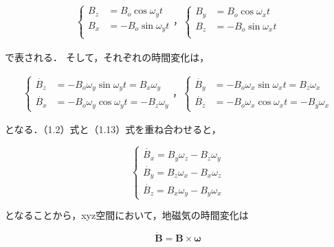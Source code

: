 \begin{align}
    \left\{
        \begin{aligned}
            B_z &= B_o\cos\omega_yt\\
            B_x &= -B_o\sin\omega_yt\\
        \end{aligned}                    
    \right.
    ，
    \left\{
        \begin{aligned}
            B_y &= B_o\cos\omega_xt\\
            B_z &= -B_o\sin\omega_xt\\
        \end{aligned}                    
    \right.
\end{align}

で表される．
そして，それぞれの時間変化は，

\begin{align}
    \left\{
        \begin{aligned}
            \dot{B_z} &= -B_o\omega_y\sin\omega_yt = B_x\omega_y\\
            \dot{B_x} &= -B_o\omega_y\cos\omega_yt = -B_z\omega_y
        \end{aligned}                    
    \right.
    ，
    \left\{
        \begin{aligned}
            \dot{B_y} &= -B_o\omega_x\sin\omega_xt = B_z\omega_x\\
            \dot{B_z} &= -B_o\omega_x\cos\omega_xt = -B_y\omega_x
        \end{aligned}                    
    \right.
\end{align}

となる．（1.2）式と（1.13）式を重ね合わせると，

\begin{equation}
    \left\{
        \begin{aligned}
            \dot{B_x} = B_y\omega_z - B_z\omega_y\\
            \dot{B_y} = B_z\omega_x - B_x\omega_z\\
            \dot{B_z} = B_x\omega_y - B_y\omega_x
        \end{aligned}
    \right.
\end{equation}

となることから，xyz空間において，地磁気の時間変化は

\begin{equation}
    \boldsymbol{\dot{B} = B \times \omega}
\end{equation}

